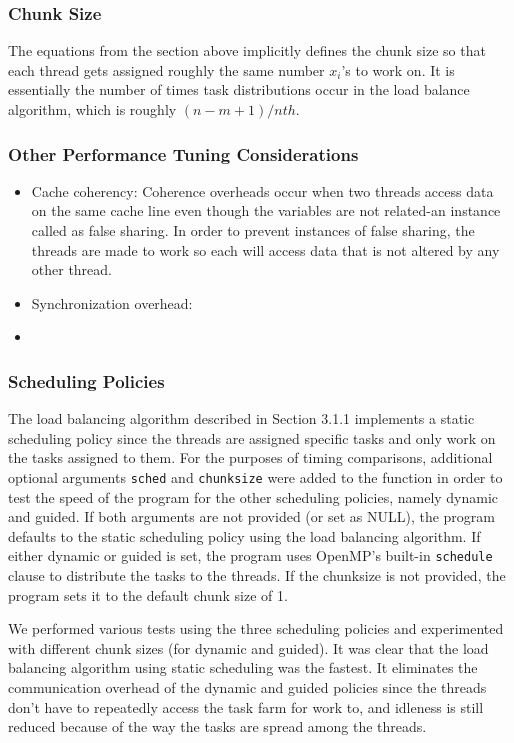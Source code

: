 \subsubsection{Chunk Size}
The equations from the section above implicitly defines the chunk size so that each thread gets assigned roughly the same number $x_{i}$'s to work on. It is essentially the number of times task distributions occur in the load balance algorithm, which is roughly $(n-m+1)/nth$.

\subsubsection{Other Performance Tuning Considerations}
\begin{itemize}
\item Cache coherency: Coherence overheads occur when two threads access data on the same cache line even though the variables are not related-an instance called as false sharing. In order to prevent instances of false sharing, the threads are made to work so each will access data that is not altered by any other thread.
\item Synchronization overhead:
\item 
\end{itemize}

\subsubsection{Scheduling Policies}
The load balancing algorithm described in Section 3.1.1 implements a static scheduling policy since the threads are assigned specific tasks and only work on the tasks assigned to them. For the purposes of timing comparisons, additional optional arguments \texttt{sched} and \texttt{chunksize} were added to the function in order to test the speed of the program for the other scheduling policies, namely dynamic and guided. If both arguments are not provided (or set as NULL), the program defaults to the static scheduling policy using the load balancing algorithm. If either dynamic or guided is set, the program uses OpenMP's built-in \texttt{schedule} clause to distribute the tasks to the threads. If the chunksize is not provided, the program sets it to the default chunk size of 1.\\
\null

We performed various tests using the three scheduling policies and experimented with different chunk sizes (for dynamic and guided). It was clear that the load balancing algorithm using static scheduling was the fastest. It eliminates the communication overhead of the dynamic and guided policies since the threads don't have to repeatedly access the task farm for work to, and idleness is still reduced because of the way the tasks are spread among the threads.\\
\null

